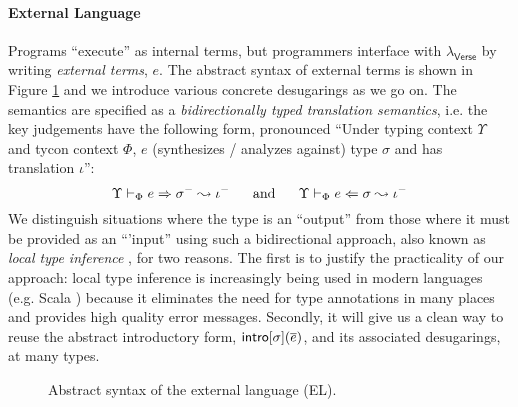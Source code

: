 \documentclass[preprint]{sigplanconf}
\newcommand{\moutput}{^{\color{gray}-}}
\begin{document}
\paragraph{External Language} Programs ``execute'' as internal terms, but programmers interface with $\lambda_\textsf{Verse}$ by writing \emph{external terms}, $e$. The abstract syntax of external terms is shown in Figure \ref{syntax-EL} and we introduce various concrete desugarings as we go on. %
The semantics are specified as a \emph{bidirectionally typed translation semantics}, i.e. the key judgements have the following form, pronounced ``Under typing context $\Upsilon$ and tycon context $\Phi$, $e$ (synthesizes / analyzes against) type $\sigma$ and has  translation $\iota$'':\[\esynX{e}{\st\moutput}{\iota\moutput} ~~~~~\text{and}~~~~~ \eanaX{e}{\st}{\iota\moutput}\]
\noindent
We distinguish situations where the type is an ``output'' from those where it must be provided as an ``'input'' using such a bidirectional approach, also known as \emph{local type inference} \cite{Pierce:2000:LTI:345099.345100}, for two reasons. The first is to justify the practicality of our approach: local type inference is increasingly being used in modern languages (e.g. Scala \cite{OdeZenZen01}) because it eliminates the need for type annotations in many places and provides high quality error messages. %
Secondly, it will  give us a clean way to reuse the abstract introductory form, ${\sf intro}[\sigma](\overline{e})$, and its associated desugarings, at many types.%



\begin{figure}[t]
\small
\hspace{-5px}
\caption{Abstract syntax of the external language (EL).}
\label{syntax-EL}\vspace{-10px}
\end{figure}
\end{document}
